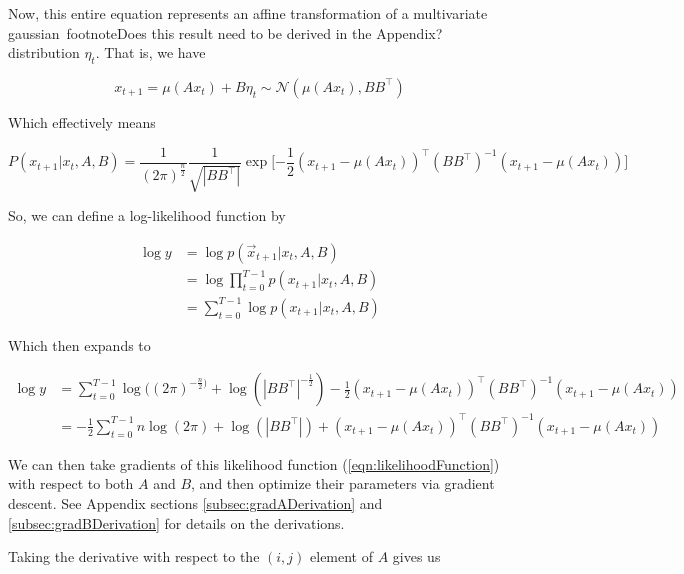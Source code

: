 \documentclass{article}
\theoremstyle{definition}
\begin{document}
Now, this entire equation represents an affine transformation of a multivariate gaussian\ footnote{Does this result need to be derived in the Appendix?} distribution $\eta_t$. That is, we have

\begin{equation}
    x_{t+1} = \mu(Ax_t) + B \eta_t \sim \mathcal{N}(\mu(Ax_t), BB^\top)
\end{equation}

Which effectively means 

\begin{equation}
    P(x_{t+1} | x_t, A, B) = \frac{1}{(2\pi)^{\frac{n}{2}}} \frac{1}{\sqrt{|BB^\top|}} \exp \big[{- \frac{1}{2}} (x_{t+1} - \mu(Ax_t))^\top (BB^\top)^{-1} (x_{t+1} - \mu(Ax_t)) \big]
\end{equation}

So, we can define a log-likelihood function by

\begin{equation}
\begin{split}
    \log y & = \log p(\Vec{x}_{t+1} | x_t, A, B) \\ 
    & = \log \prod_{t=0}^{T - 1} p(x_{t+1} | x_t, A, B) \\ 
    & = \sum_{t=0}^{T - 1} \log p(x_{t+1} | x_t, A, B)
\end{split}
\end{equation}

Which then expands to 

\begin{equation}
\label{eqn:likelihoodFunction}
\begin{split}
    \log y &= \sum_{t=0}^{T - 1} \log((2\pi)^{-\frac{n}{2})} + \log(|BB^\top|^{-\frac{1}{2}}) - \frac{1}{2}(x_{t+1} - \mu(Ax_t))^\top (BB^\top)^{-1} (x_{t+1} - \mu(Ax_t)) \\ 
    &= - \frac{1}{2} \sum_{t=0}^{T - 1} n \log(2\pi) + \log(|BB^\top|) + (x_{t+1} - \mu(Ax_t))^\top (BB^\top)^{-1} (x_{t+1} - \mu(Ax_t))
\end{split}
\end{equation}

We can then take gradients of this likelihood function (\ref{eqn:likelihoodFunction}) with respect to both $A$ and $B$, and then optimize their parameters via gradient descent. See Appendix sections \ref{subsec:gradADerivation} and \ref{subsec:gradBDerivation} for details on the derivations.

Taking the derivative with respect to the $(i,j)$ element of $A$ gives us
\end{document}

